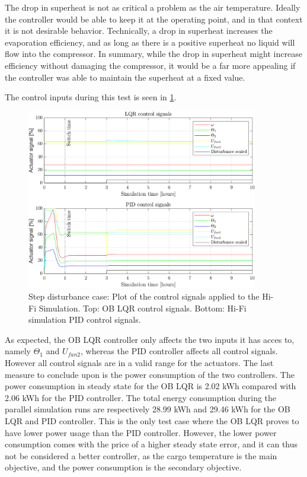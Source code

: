 The drop in superheat is not as critical a problem as the air temperature. Ideally the controller would be able to keep it at the operating point, and in that context it is not desirable behavior. Technically, a drop in superheat increases the evaporation efficiency, and as long as there is a positive superheat no liquid will flow into the compressor. In summary, while the drop in superheat might increase efficiency without damaging the compressor, it would be a far more appealing if the controller was able to maintain the superheat at a fixed value.

The control inputs during this test is seen in \cref{fig:inputs_stepDist}.

\begin{figure}[H]
	\centering
	\includegraphics[width=0.9\textwidth]{Graphics/fig_inputs_stepDist.png}
	\caption{Step disturbance case: Plot of the control signals applied to the Hi-Fi Simulation. Top: OB LQR control signals. Bottom: Hi-Fi simulation PID control signals.}
	\label{fig:inputs_stepDist}
\end{figure}

As expected, the OB LQR controller only affects the two inputs it has acces to, namely $ \Theta_1 $ and $ U_{fan2} $, whereas the PID controller affects all control signals. However all control signals are in a valid range for the actuators.
The last measure to conclude upon is the power consumption of the two controllers. The power consumption in steady state for the OB LQR is 2.02 \si{kWh} compared with 2.06 \si{kWh} for the PID controller. The total energy consumption during the parallel simulation runs are respectively 28.99 \si{kWh} and 29.46 \si{kWh} for the OB LQR and PID controller.
This is the only test case where the OB LQR proves to have lower power usage than the PID controller. However, the lower power consumption comes with the price of a higher steady state error, and it can thus not be considered a better controller, as the cargo temperature is the main objective, and the power consumption is the secondary objective. 


